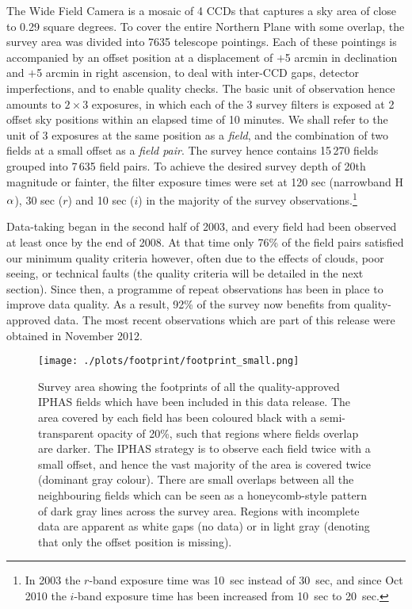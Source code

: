 \documentclass[useAMS,usenatbib]{mn2e}
\def\ha{\mbox{H$\rm \alpha$}}
\begin{document}
The Wide Field Camera is a mosaic of 4 CCDs 
that captures a sky area of close to 0.29 square degrees.
To cover the entire Northern Plane with some overlap,
the survey area was divided into 7635 telescope pointings.
Each of these pointings is accompanied by an offset position
at a displacement of $+$5 arcmin in declination 
and $+$5 arcmin in right ascension,
to deal with inter-CCD gaps, detector imperfections,
and to enable quality checks. 
The basic unit of observation hence
amounts to $2 \times 3$ exposures, 
in which each of the 3 survey filters is exposed at 2 offset sky positions 
within an elapsed time of 10 minutes.
We shall refer to the unit of 3 exposures at the same position 
as a \emph{field},
and the combination of two fields at a small offset as a \emph{field pair}.
The survey hence contains 15\,270 fields grouped into 7\,635 field pairs.
To achieve the desired survey depth of 20th magnitude or fainter, 
the filter exposure times were set at 120 sec (narrowband \ha), 
30 sec ($r$) and 10 sec ($i$)
in the majority of the survey observations.\footnote{In 2003 
the $r$-band exposure time was 10~sec instead of 30~sec,
and since Oct 2010 the $i$-band exposure time 
has been increased from 10~sec to 20~sec.}

Data-taking began in the second half of 2003, 
and every field had been observed at least once by the end of 2008.
At that time only 76\% of the field pairs 
satisfied our minimum quality criteria however,  
often due to the effects of clouds, poor seeing, or technical faults
(the quality criteria will be detailed in the next section). 
Since then, a programme of repeat observations has been in place 
to improve data quality. 
As a result, 92\% of the survey 
now benefits from quality-approved data.
The most recent observations which are part of this release
were obtained in November 2012.

\begin{figure*}
        \texttt{[image: ./plots/footprint/footprint\_small.png]}
        \caption{Survey area showing the footprints
        of all the quality-approved IPHAS fields
        which have been included in this data release.
        The area covered by each field has been coloured black
        with a semi-transparent opacity of 20\%,
        such that regions where fields overlap are darker.
        The IPHAS strategy is to observe each field twice
        with a small offset,
        and hence the vast majority of the area 
        is covered twice (dominant gray colour).
        There are small overlaps between all the neighbouring fields
        which can be seen as a honeycomb-style pattern
        of dark gray lines across the survey area.
        Regions with incomplete data are apparent as white gaps (no data) 
        or in light gray (denoting that only the offset position is missing).}
        \label{fig:footprint}
\end{figure*}
\end{document}
